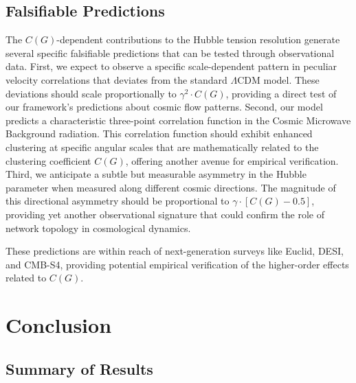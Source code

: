 \documentclass[11pt,english,twoside]{article}
\begin{document}
\subsection{Falsifiable Predictions}

The $C(G)$-dependent contributions to the Hubble tension resolution generate several specific falsifiable predictions that can be tested through observational data. First, we expect to observe a specific scale-dependent pattern in peculiar velocity correlations that deviates from the standard $\Lambda$CDM model. These deviations should scale proportionally to $\gamma^2 \cdot C(G)$, providing a direct test of our framework's predictions about cosmic flow patterns. Second, our model predicts a characteristic three-point correlation function in the Cosmic Microwave Background radiation. This correlation function should exhibit enhanced clustering at specific angular scales that are mathematically related to the clustering coefficient $C(G)$, offering another avenue for empirical verification. Third, we anticipate a subtle but measurable asymmetry in the Hubble parameter when measured along different cosmic directions. The magnitude of this directional asymmetry should be proportional to $\gamma \cdot [C(G) - 0.5]$, providing yet another observational signature that could confirm the role of network topology in cosmological dynamics.

These predictions are within reach of next-generation surveys like Euclid, DESI, and CMB-S4, providing potential empirical verification of the higher-order effects related to $C(G)$.

\section{Conclusion}

\subsection{Summary of Results}
\end{document}
